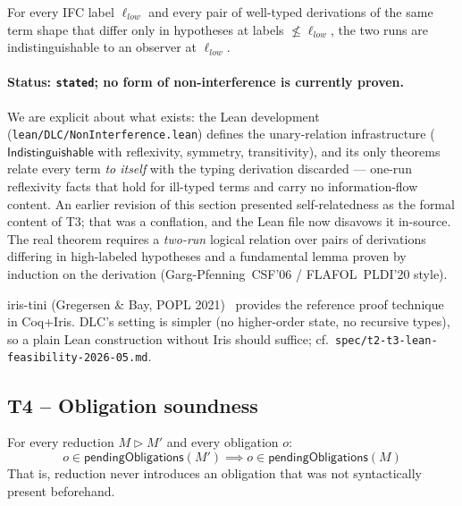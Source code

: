 \begin{theorem}
For every IFC label $\ell_{\mathit{low}}$ and every pair of well-typed
derivations of the same term shape that differ only in hypotheses at
labels $\not\leq \ell_{\mathit{low}}$, the two runs are
indistinguishable to an observer at $\ell_{\mathit{low}}$.
\end{theorem}

\paragraph{Status: \texttt{stated}; no form of non-interference is
currently proven.}
We are explicit about what exists: the Lean development
(\texttt{lean/DLC/NonInterference.lean}) defines the unary-relation
infrastructure ($\mathsf{Indistinguishable}$ with reflexivity,
symmetry, transitivity), and its only theorems relate every term
\emph{to itself} with the typing derivation discarded --- one-run
reflexivity facts that hold for ill-typed terms and carry no
information-flow content.  An earlier revision of this section
presented self-relatedness as the formal content of T3; that was a
conflation, and the Lean file now disavows it in-source.  The real
theorem requires a \emph{two-run} logical relation over pairs of
derivations differing in high-labeled hypotheses and a fundamental
lemma proven by induction on the derivation
(Garg-Pfenning~CSF'06 / FLAFOL~PLDI'20 style).

iris-tini (Gregersen \& Bay, POPL
2021)~\cite{gregersen2021tini} provides the reference proof technique
in Coq+Iris.  DLC's setting is simpler (no higher-order state, no
recursive types), so a plain Lean construction without Iris should
suffice; cf.\ \texttt{spec/t2-t3-lean-feasibility-2026-05.md}.

\subsection{T4 -- Obligation soundness}

\begin{theorem}
For every reduction $M \rhd M'$ and every obligation $o$:
\[
o \in \mathsf{pendingObligations}(M') \implies o \in \mathsf{pendingObligations}(M)
\]
That is, reduction never introduces an obligation that was not
syntactically present beforehand.
\end{theorem}

